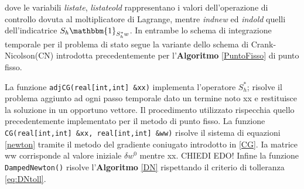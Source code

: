 dove le variabili \textit{listate}, \textit{listateold} rappresentano i valori dell'operazione di controllo dovuta al moltiplicatore di Lagrange, mentre \textit{indnew} ed \textit{indold} quelli dell'indicatrice $S_h\mathbbm{1}_{S^*_hw}$.
In entrambe lo schema di integrazione temporale per il problema di stato segue la variante dello schema di Crank-Nicolson(CN) introdotta precedentemente per l'\textbf{Algoritmo} \ref{PuntoFisso} di punto fisso.
\par
La funzione \texttt{adjCG(real[int,int] \&xx)} implementa l'operatore $S^*_h$; risolve il problema aggiunto ad ogni passo temporale dato un termine noto xx e restituisce la soluzione in un opportuno vettore. Il procedimento utilizzato rispecchia quello precedentemente implementato per il metodo di punto fisso.
La funzione \texttt{CG(real[int,int] \&xx, real[int,int] \&ww)} risolve il sistema di equazioni \eqref{newton} tramite il metodo del gradiente coniugato introdotto in \ref{CG}. Ia matrice ww corrisponde al valore iniziale ${\delta}w^0$  mentre xx. CHIEDI EDO!
Infine la funzione \texttt{DampedNewton()} risolve l'\textbf{Algoritmo} \ref{DN} rispettando il criterio di tolleranza \eqref{eq:DNtoll}.